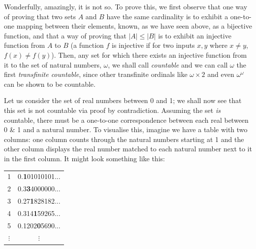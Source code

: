 Wonderfully, amazingly, it is not so. To prove this, we first observe that one way of proving that two sets \(A\) and \(B\) have the same cardinality is to exhibit a one-to-one mapping between their elements, known, as we have seen above, as a bijective function, and that a way of proving that \(|A| \leq |B| \) is to exhibit an injective function from \(A\) to \(B\) (a function \(f\) is injective if for two inputs \(x, y\) where \(x \neq y\), \(f(x) \neq f(y)\)). Then, any set for which there exists an injective function from it to the set of natural numbers, \(\omega\), we shall call \textit{countable} and we can call \(\omega\) the first \textit{transfinite countable}, since other transfinite ordinals like \(\omega\times{}2\) and even \(\omega^\omega\) can be shown to be countable.

Let us consider the set of real numbers between 0 and 1; we shall now see that this set is not countable via proof by contradiction. Assuming the set \textit{is} countable, there must be a one-to-one correspondence between each real between 0 \& 1 and a natural number. To visualise this, imagine we have a table with two columns: one column counts through the natural numbers starting at 1 and the other column displays the real number matched to each natural number next to it in the first column. It might look something like this:

\begin{center}
	\begin{tabular}{ |c|c| }
		\hline
		1 & 0.\textbf{1}01010101... \\
		2 & 0.3\textbf{3}4000000... \\
		3 & 0.27\textbf{1}828182... \\
		4 & 0.314\textbf{1}59265... \\
		5 & 0.1202\textbf{0}5690... \\
		\(\vdots\) & \(\vdots\) \\
		\hline
	\end{tabular}
\end{center}

